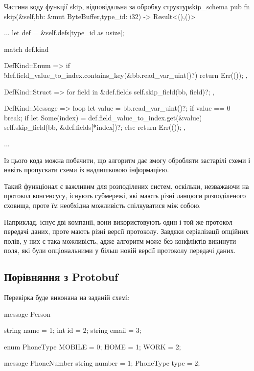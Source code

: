 \documentclass{lib/styles/default-style}
\begin{document}
    \begin{code}{Частина коду функції skip, відповідальна за обробку структур}{skip_schema}
        pub fn skip(&self,bb: &mut ByteBuffer,type_id: i32) -> Result<(),()> {
        ...
                let def = &self.defs[type_id as usize];

                match def.kind {
                DefKind::Enum => {
                    if !def.field_value_to_index.contains_key(&bb.read_var_uint()?) {
                    return Err(());
                    }
                },

                DefKind::Struct => {
                    for field in &def.fields {
                    self.skip_field(bb, field)?;
                    }
                },

                DefKind::Message => {
                    loop {
                    let value = bb.read_var_uint()?;
                    if value == 0 {
                        break;
                    }
                    if let Some(index) = def.field_value_to_index.get(&value) {
                        self.skip_field(bb, &def.fields[*index])?;
                    } else {
                        return Err(());
                    }
                    }
                },
            }
        ...
        }\end{code}

    Із цього кода можна побачити, що алгоритм дає змогу обробляти застарілі схеми і навіть пропускати схеми із надлишковою інформацією.

    Такий функціонал є важливим для розподілених систем, оскільки, незважаючи на протокол консенсусу,
    існують субмережі, які мають різні ланцюги розподіленого сховища, проте їм необхідна можливість спілкуватися між собою.

    Наприклад, існує дві компанії, вони використовують один і той же протокол передачі даних, проте мають різні версії протоколу.
    Завдяки серіалізації опційних полів, у них є така можливість, адже алгоритм може без конфліктів викинути поля, які були опціональними
    у більш новій версії протоколу передачі даних.

    \subsection{Порівняння з Protobuf}

    Перевірка буде виконана на заданій схемі:
    
    \begin{snippet}
        message Person {
            string name = 1;
            int id = 2;
            string email = 3;

            enum PhoneType {
                MOBILE = 0;
                HOME = 1;
                WORK = 2;
            }

            message PhoneNumber {
                string number = 1;
                PhoneType type = 2;
            }
        }\end{snippet}
\end{document}
